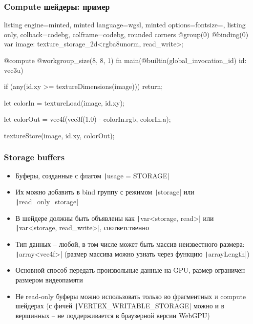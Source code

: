 \documentclass[10pt]{beamer}
\begin{document}
\begin{frame}[fragile]
\frametitle{Compute шейдеры: пример}
\begin{tcblisting}{listing engine=minted, minted language=wgsl, minted options={fontsize=\scriptsize}, listing only, colback=codebg, colframe=codebg, rounded corners}
@group(0) @binding(0) var image:
  texture_storage_2d<rgba8unorm, read_write>;

@compute @workgroup_size(8, 8, 1)
fn main(@builtin(global_invocation_id) id: vec3u) {
    if (any(id.xy >= textureDimensions(image))) {
      return;
    }

    let colorIn = textureLoad(image, id.xy);

    let colorOut = vec4f(vec3f(1.0) - colorIn.rgb, colorIn.a);

    textureStore(image, id.xy, colorOut);
}
\end{tcblisting}
\end{frame}

\begin{frame}[fragile]
\frametitle{Storage buffers}
\begin{itemize}
\item Буферы, созданные с флагом \texttt|usage = STORAGE|
\pause
\item Их можно добавить в bind группу с режимом \texttt|storage| или \texttt|read_only_storage|
\pause
\item В шейдере должны быть объявлены как \texttt|var<storage, read>| или \texttt|var<storage, read_write>|, соответственно
\pause
\item Тип данных -- любой, в том числе может быть массив неизвестного размера: \texttt|array<vec4f>| (размер массива можно узнать через функцию \texttt|arrayLength|)
\pause
\item Основной способ передать произвольные данные на GPU, размер ограничен размером видеопамяти
\pause
\item Не read-only буферы можно использовать только во фрагментных и compute шейдерах (с фичей \texttt|VERTEX_WRITABLE_STORAGE| можно и в вершинных -- не поддерживается в браузерной версии WebGPU)
\end{itemize}
\end{frame}
\end{document}
